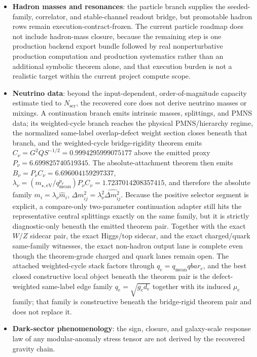 \begin{itemize}
beneath this theorem pair. The \(\varepsilon = 1/6\) texture language is the extra uniform-center-label collapse of this richer dictionary and is not a recovered-core theorem.
\item \textbf{Hadron masses and resonances}: the particle branch supplies the seeded-family, correlator, and stable-channel readout bridge, but promotable hadron rows remain execution-contract-frozen. The current particle roadmap does not include hadron-mass closure, because the remaining step is one production backend export bundle followed by real nonperturbative production computation and production systematics rather than an additional symbolic theorem alone, and that execution burden is not a realistic target within the current project compute scope.
\item \textbf{Neutrino data}: beyond the input-dependent, order-of-magnitude capacity estimate tied to $N_{\mathrm{scr}}$, the recovered core does not derive neutrino masses or mixings. A continuation branch emits intrinsic masses, splittings, and PMNS data; its weighted-cycle branch reaches the physical PMNS/hierarchy regime, the normalized same-label overlap-defect weight section closes beneath that branch, and the weighted-cycle bridge-rigidity theorem emits \(C_\nu=G^2Q S^{-1/2}=0.9994295999075177\) above the emitted proxy \(P_\nu=6.699825740519345\). The absolute-attachment theorem then emits \(B_\nu=P_\nu C_\nu=6.696004159297337\), \(\lambda_\nu=(m_{\star,\mathrm{eV}}/q_{\mathrm{mean}}^{p_\nu})P_\nu C_\nu=1.7237014208357415\), and therefore the absolute family \(m_i=\lambda_\nu\hat m_i\), \(\Delta m_{ij}^2=\lambda_\nu^2\widehat{\Delta m_{ij}^2}\). Because the positive selector segment is explicit, a compare-only two-parameter continuation adapter still hits the representative central splittings exactly on the same family, but it is strictly diagnostic-only beneath the emitted theorem pair. Together with the exact \(W/Z\) sidecar pair, the exact Higgs/top sidecar, and the exact charged/quark same-family witnesses, the exact non-hadron output lane is complete even though the theorem-grade charged and quark lanes remain open. The attached weighted-cycle stack factors through \(q_e = q_{\mathrm{mean}} qbar_e\), and the best closed constructive local object beneath the theorem pair is the defect-weighted same-label edge family \(q_e=\sqrt{g_e d_e}\) together with its induced \(\mu_e\) family; that family is constructive beneath the bridge-rigid theorem pair and does not replace it.
\item \textbf{Dark-sector phenomenology}: the sign, closure, and galaxy-scale response law of any modular-anomaly stress tensor are not derived by the recovered gravity chain.

\end{itemize}
